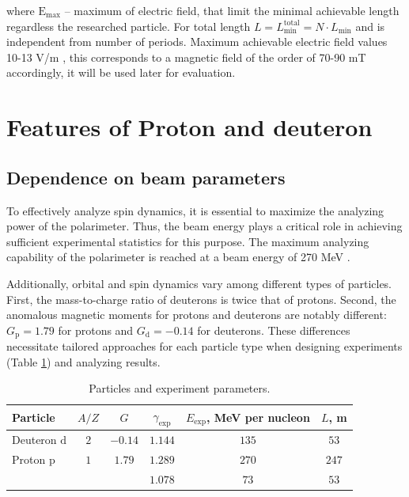 \documentclass[submitting]{nst}
\begin{document}
\noindent where $\mathrm{E}_{\text{max}}$ -- maximum of electric field, that limit the minimal achievable length regardless the researched particle. For total length $L=L_{\text{min}}^{\text{total}} = N\cdot L_{\text{min}}$ and is independent from number of periods. Maximum achievable electric field values 10-13 V/m \cite{wien}, this corresponds to a magnetic field of the order of 70-90 mT accordingly, it will be used later for evaluation.

\section{Features of Proton and deuteron}\label{sec.III}

\subsection{Dependence on beam parameters}

\par To effectively analyze spin dynamics, it is essential to maximize the analyzing power of the polarimeter. Thus, the beam energy plays a critical role in achieving sufficient experimental statistics for this purpose. The maximum analyzing capability of the polarimeter is reached at a beam energy of 270 MeV \cite{Pol}. 

\par Additionally, orbital and spin dynamics vary among different types of particles. First, the mass-to-charge ratio of deuterons is twice that of protons. Second, the anomalous magnetic moments for protons and deuterons are notably different: $G_{\text{p}} = 1.79$  for protons and $G_{\text{d}} = -0.14$ for deuterons. These differences necessitate tailored approaches for each particle type when designing experiments (Table \ref{tab:particles}) and analyzing results.

\begin{table}[!htb]
	\caption{Particles and experiment parameters.}
	\label{tab:particles}
	\begin{tabular*}{8cm} {@{\extracolsep{\fill} } lccccc}
		\toprule
		Particle & $A/Z$ & $G$     & $\gamma_{\text{exp}}$ & $E_{\text{exp}}$, MeV per nucleon  & $L$, m \\
		\midrule
		Deuteron $\text{d}$ & $2$   & $-0.14$ & $1.144$  & $135$ & $53$ \\
		Proton $\text{p}$ & $1$   & $1.79$  & $1.289$ & $270$ & $247$ \\
		  &    &   & $1.078$ & $73$ & $53$ \\
		\bottomrule
	\end{tabular*}
\end{table}
\end{document}
